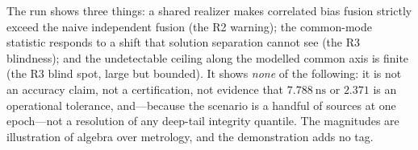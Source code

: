 The run shows three things: a shared realizer makes correlated bias fusion strictly
exceed the naive independent fusion (the R2 warning); the common-mode statistic
responds to a shift that solution separation cannot see (the R3 blindness); and the
undetectable ceiling along the modelled common axis is finite (the R3 blind spot,
large but bounded). It shows \emph{none} of the following: it is not an accuracy
claim, not a certification, not evidence that $\SI{7.788}{\nano\second}$ or
$2.371$ is an operational tolerance, and---because the scenario is a handful of
sources at one epoch---not a resolution of any deep-tail integrity quantile. The
magnitudes are \Modelled{} illustration of \Proven{} algebra over \Cited{}
metrology, and the demonstration adds no \Validated{} tag.
